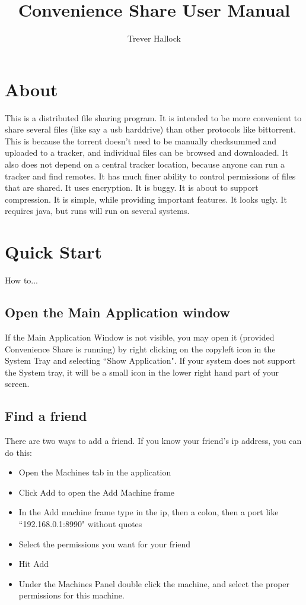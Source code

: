 \documentclass{article}
\author{Trever Hallock}
\title{Convenience Share User Manual}
\begin{document}
\maketitle

\tableofcontents

\section{About}

This is a distributed file sharing program.
It is intended to be more convenient to share several files (like say a usb harddrive) than other protocols like bittorrent.
This is because the torrent doesn't need to be manually checksummed and uploaded to a tracker, and individual files can be browsed and downloaded.
It also does not depend on a central tracker location, because anyone can run a tracker and find remotes.
It has much finer ability to control permissions of files that are shared.
It uses encryption.
It is buggy.
It is about to support compression.
It is simple, while providing important features.
It looks ugly.
It requires java, but runs will run on several systems.







\section{Quick Start}
How to...


\subsection{Open the Main Application window}
If the Main Application Window is not visible, you may open it (provided Convenience Share is running) by right clicking on the copyleft icon in the System Tray and selecting ``Show Application". If your system does not support the System tray, it will be a small icon in the lower right hand part of your screen.

\subsection{Find a friend}
There are two ways to add a friend.
If you know your friend's ip address, you can do this:
\begin{itemize}
  \item Open the Machines tab in the application
  \item Click Add to open the Add Machine frame
  \item In the Add machine frame type in the ip, then a colon, then a port like ``192.168.0.1:8990" without quotes
  \item Select the permissions you want for your friend
  \item Hit Add
  \item Under the Machines Panel double click the machine, and select the proper permissions for this machine.
\end{itemize}
\end{document}
